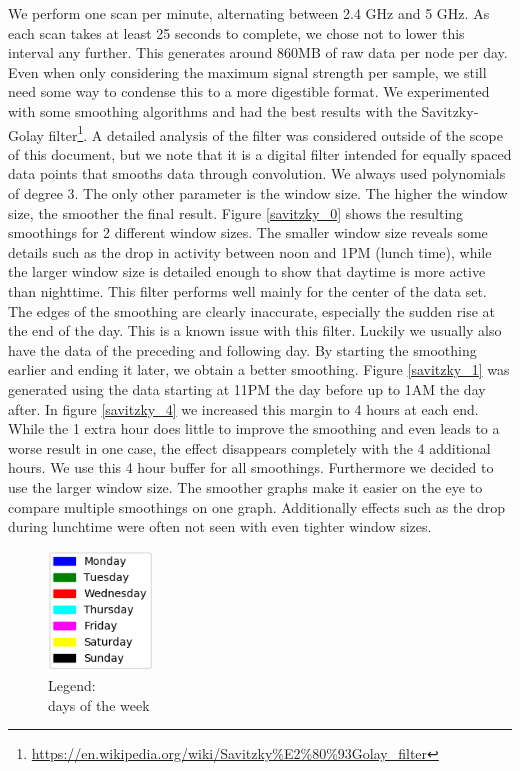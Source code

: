 \documentclass[a4paper, 11pt]{article}
\begin{document}
We perform one scan per minute, alternating between 2.4 GHz and 5 GHz. As each scan takes at least 25 seconds to complete, we chose not to lower this interval any further. This generates around 860MB of raw data per node per day. Even when only considering the maximum signal strength per sample, we still need some way to condense this to a more digestible format. We experimented with some smoothing algorithms and had the best results with the Savitzky-Golay filter\footnote{\url{https://en.wikipedia.org/wiki/Savitzky\%E2\%80\%93Golay_filter}}. A detailed analysis of the filter was considered outside of the scope of this document, but we note that it is a digital filter intended for equally spaced data points that smooths data through convolution. We always used polynomials of degree 3. The only other parameter is the window size. The higher the window size, the smoother the final result. Figure \ref{savitzky_0} shows the resulting smoothings for 2 different window sizes. The smaller window size reveals some details such as the drop in activity between noon and 1PM (lunch time), while the larger window size is detailed enough to show that daytime is more active than nighttime. This filter performs well mainly for the center of the data set. The edges of the smoothing are clearly inaccurate, especially the sudden rise at the end of the day. This is a known issue with this filter. Luckily we usually also have the data of the preceding and following day. By starting the smoothing earlier and ending it later, we obtain a better smoothing. Figure \ref{savitzky_1} was generated using the data starting at 11PM the day before up to 1AM the day after. In figure \ref{savitzky_4} we increased this margin to 4 hours at each end. While the 1 extra hour does little to improve the smoothing and even leads to a worse result in one case, the effect disappears completely with the 4 additional hours. We use this 4 hour buffer for all smoothings. Furthermore we decided to use the larger window size. The smoother graphs make it easier on the eye to compare multiple smoothings on one graph. Additionally effects such as the drop during lunchtime were often not seen with even tighter window sizes.\\
\newpage %
\begin{figure}
\centering
\captionsetup{justification=centering}
\includegraphics[width=0.25\textwidth]{legend.png}
\caption{Legend:\\ days of the week}
\label{legend}
\end{figure}
\end{document}
